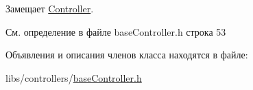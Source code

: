 Замещает \hyperlink{class_controller_a4cc69a630011f49efb0c221d617af633}{Controller}.



См. определение в файле base\-Controller.\-h строка 53



Объявления и описания членов класса находятся в файле\-:\begin{DoxyCompactItemize}
\item 
libs/controllers/\hyperlink{base_controller_8h}{base\-Controller.\-h}\end{DoxyCompactItemize}
